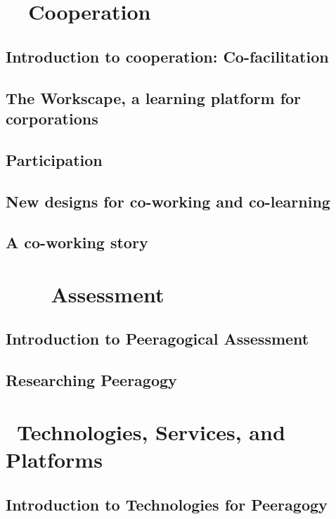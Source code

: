 \documentclass[ebook, 12pt, twoside]{memoir}
\begin{document}
\part{~~Cooperation} %
%
\chapter[\textbf{Co-facilitation}]{Introduction to cooperation: Co-facilitation}

%
\chapter[\textbf{The Workscape}]{ The Workscape, a learning platform for corporations }
%

\chapter[\textbf{Participation}]{ Participation }
%

%
\chapter[\textbf{Designs for co-working}]{New designs for co-working and co-learning}
%

%
\chapter[\textbf{A co-working story}]{A co-working story}
%




\part{~~~~Assessment} %
%
\chapter[\textbf{Peeragogical Assessment}]{Introduction to Peeragogical Assessment}

%
\chapter[\textbf{Researching Peeragogy}]{Researching Peeragogy}
%



\part{~Technologies, Services, and Platforms } %
%
\chapter[\textbf{Peeragogy Technology}]{Introduction to Technologies for Peeragogy}

%
\end{document}
